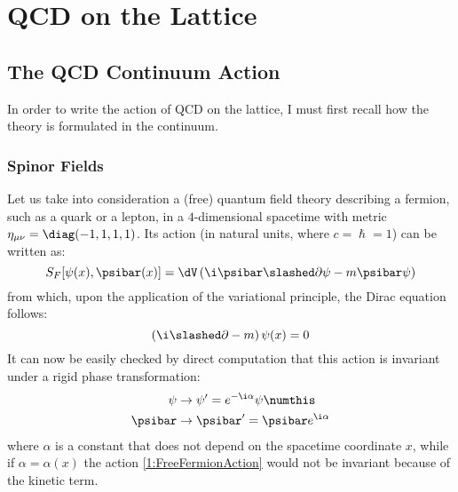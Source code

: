 \pagestyle{myFancy}
\chapter{QCD on the Lattice}
\section{The QCD Continuum Action}
In order to write the action of QCD on the lattice, I must first recall how the theory is formulated in the continuum.

\subsection{Spinor Fields}
Let us take into consideration a (free) quantum field theory describing a fermion, such as a quark or a lepton, in a $4$-dimensional spacetime with metric $\eta_{\mu\nu} = \diag(-1,1,1,1)$. Its action (in natural units, where $c = \hslash = 1$) can be written as:
\begin{equation}
      S_F[\psi(x),\psibar(x)] = \dV \left( \i\psibar\slashed\partial\psi - m\psibar\psi \right) \label{1:FreeFermionAction}
\end{equation}
from which, upon the application of the variational principle, the Dirac equation follows:
\begin{equation}
    \left( \i\slashed\partial-m \right) \psi(x) = 0 \label{1:DiracEq}
\end{equation}
It can now be easily checked by direct computation that this action is invariant under a rigid phase transformation:
\begin{align*}
    \psi &\rightarrow \psi' = e^{-\i\alpha}\psi \numthis\label{1:PhaseTransform} \\
    \psibar &\rightarrow \psibar' = \psibar e^{\i\alpha}
\end{align*}
where $\alpha$ is a constant that does not depend on the spacetime coordinate $x$, while if $\alpha=\alpha(x)$ the action \eqref{1:FreeFermionAction} would not be invariant because of the kinetic term.

